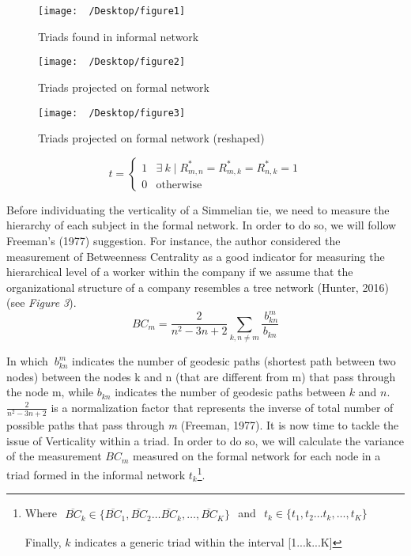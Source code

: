 \documentclass{article}
\begin{document}
\begin{figure}
\begin{center}
\texttt{[image: ~/Desktop/figure1]}\caption{Triads found in informal network}
\bigskip
\texttt{[image: ~/Desktop/figure2]}\caption{Triads projected on formal network}
\end{center}
\end{figure}
\begin{figure}
\begin{center}
\texttt{[image: ~/Desktop/figure3]}\caption{Triads projected on formal network (reshaped)}
\end{center}
\end{figure}




\begin{equation} \label{eqn}
t= \begin{cases} 1 & \exists~k \mid R_{m,n}^*=R_{m,k}^*=R_{n,k}^*=1 \\ 0 & \mbox{otherwise}  \end{cases}
\end{equation}

Before individuating the verticality of a Simmelian tie, we need to measure the hierarchy of each subject in the formal network. In order to do so, we will follow Freeman’s (1977) suggestion. For instance, the author considered the measurement of Betweenness Centrality as a good indicator for measuring the hierarchical level of a worker within the company if we assume that the organizational structure of a company resembles a tree network (Hunter, 2016) (see \emph{Figure 3}).
\begin{equation}
{BC}_m=\frac{2}{n^2-3n+2}\sum_{k,n\neq m}\frac{{\ b}_{kn}^m}{b_{kn}}
\end{equation}

In which ${\ b}_{kn}^m$ indicates the number of geodesic paths (shortest path between two nodes) between the nodes k and n (that are different from m) that pass through the node m, while $b_{kn}$ indicates the number of geodesic paths between $k$ and $n$. $\frac{2}{n^2-3n+2}$ is a normalization factor that represents the inverse of total number of possible paths that pass through \emph{m} (Freeman, 1977).
It is now time to tackle the issue of Verticality within a triad. In order to do so, we will calculate the variance of the measurement $BC_m$ measured on the formal network for each node in a triad formed in the informal network $t_k$\footnote{

Where
$\begin{aligned}
\overline{BC}_k \in \{\overline{BC}_1, \overline{BC}_2\dots \overline{BC}_k, \dots, \overline{BC}_K\}
\end{aligned}$
and
$\begin{aligned}
	t_k \in \{t_1, t_2\dots t_k, \dots, t_ K\}
\end{aligned}$

Finally, $k$ indicates a generic triad within the interval  [1...k...K]
}.
\end{document}
